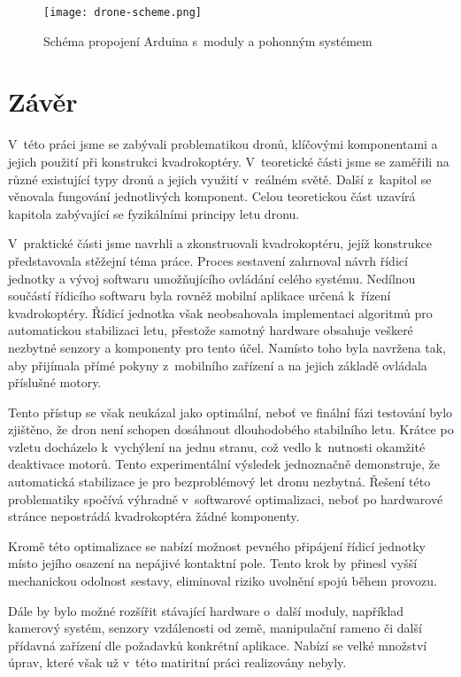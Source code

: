 \documentclass[12pt]{report}
\begin{document}
\vspace{40pt}
\begin{figure}[H]
	\centering
	\texttt{[image: drone-scheme.png]}
	\caption{Schéma propojení Arduina s~moduly a pohonným systémem \cite{fritzing}}
	\label{fig:drone-scheme.png}
\end{figure}

\chapter*{Závěr}
	
V~této práci jsme se zabývali problematikou dronů, klíčovými komponentami a jejich použití při konstrukci kvadrokoptéry. V~teoretické části jsme se zaměřili na různé existující typy dronů a jejich využití v~reálném světě. Další z~kapitol se věnovala fungování jednotlivých komponent. Celou teoretickou část uzavírá kapitola zabývající se fyzikálními principy letu dronu.

V~praktické části jsme navrhli a zkonstruovali kvadrokoptéru, jejíž konstrukce představovala stěžejní téma práce. Proces sestavení zahrnoval návrh řídicí jednotky a vývoj softwaru umožňujícího ovládání celého systému. Nedílnou součástí řídicího softwaru byla rovněž mobilní aplikace určená k~řízení kvadrokoptéry. Řídicí jednotka však neobsahovala implementaci algoritmů pro automatickou stabilizaci letu, přestože samotný hardware obsahuje veškeré nezbytné senzory a komponenty pro tento účel. Namísto toho byla navržena tak, aby přijímala přímé pokyny z~mobilního zařízení a na jejich základě ovládala příslušné motory.

Tento přístup se však neukázal jako optimální, neboť ve finální fázi testování bylo zjištěno, že dron není schopen dosáhnout dlouhodobého stabilního letu. Krátce po vzletu docházelo k~vychýlení na jednu stranu, což vedlo k~nutnosti okamžité deaktivace motorů. Tento experimentální výsledek jednoznačně demonstruje, že automatická stabilizace je pro bezproblémový let dronu nezbytná. Řešení této problematiky spočívá výhradně v~softwarové optimalizaci, neboť po hardwarové stránce nepostrádá kvadrokoptéra žádné komponenty.

Kromě této optimalizace se nabízí možnost pevného připájení řídicí jednotky místo jejího osazení na nepájivé kontaktní pole. Tento krok by přinesl vyšší mechanickou odolnost sestavy, eliminoval riziko uvolnění spojů během provozu.

Dále by bylo možné rozšířit stávající hardware o~další moduly, například kamerový systém, senzory vzdálenosti od země, manipulační rameno či další přídavná zařízení dle požadavků konkrétní aplikace. Nabízí se velké množství úprav, které však už v~této matiritní práci realizovány nebyly.
	
\end{document}
